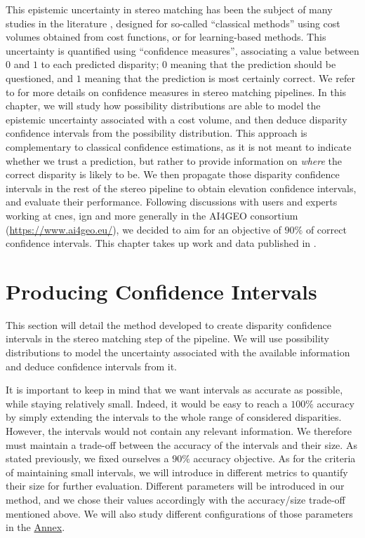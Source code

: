 This epistemic uncertainty in stereo matching has been the subject of many studies in the literature \cite{hu_quantitative_2012,  poggi_confidence_2021,wang_uncertainty_2022}, designed for so-called ``classical methods'' using cost volumes obtained from cost functions, or for learning-based methods. This uncertainty is quantified using ``confidence measures'', associating a value between $0$ and $1$ to each predicted disparity; $0$ meaning that the prediction should be questioned, and $1$ meaning that the prediction is most certainly correct. We refer to  for more details on confidence measures in stereo matching pipelines. In this chapter, we will study how possibility distributions are able to model the epistemic uncertainty associated with a cost volume, and then deduce disparity confidence intervals from the possibility distribution. This approach is complementary to classical confidence estimations, as it is not meant to indicate whether we trust a prediction, but rather to provide information on \textit{where} the correct disparity is likely to be. We then propagate those disparity confidence intervals in the rest of the stereo pipeline to obtain elevation confidence intervals, and evaluate their performance. Following discussions with users and experts working at \acrshort{cnes}, \acrshort{ign} and more generally in the AI4GEO consortium (\url{https://www.ai4geo.eu/}), we decided to aim for an objective of $90\%$ of correct confidence intervals. This chapter takes up work and data published in \cite{malinowski_robust_2024-1}.

\section{Producing Confidence Intervals}
This section will detail the method developed to create disparity confidence intervals in the stereo matching step of the pipeline. We will use possibility distributions to model the uncertainty associated with the available information and deduce confidence intervals from it.

It is important to keep in mind that we want intervals as accurate as possible, while staying relatively small. Indeed, it would be easy to reach a $100\%$ accuracy by simply extending the intervals to the whole range of considered disparities. However, the intervals would not contain any relevant information. We therefore must maintain a trade-off between the accuracy of the intervals and their size. As stated previously, we fixed ourselves a $90\%$ accuracy objective. As for the criteria of maintaining small intervals, we will introduce in  different metrics to quantify their size for further evaluation. Different parameters will be introduced in our method, and we chose their values accordingly with the accuracy/size trade-off mentioned above. We will also study different configurations of those parameters in the \hyperref[chap:annex]{Annex}.

